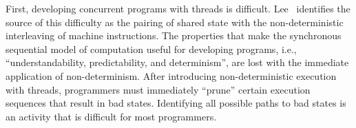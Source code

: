 First, developing concurrent programs with threads is difficult.
Lee~\cite{lee_threads} identifies the source of this difficulty as the pairing of shared state with the non-deterministic interleaving of machine instructions.
The properties that make the synchronous sequential model of computation useful for developing programs, i.e., ``understandability, predictability, and determinism'', are lost with the immediate application of non-determinism.
After introducing non-deterministic execution with threads, programmers must immediately ``prune'' certain execution sequences that result in bad states.
Identifying all possible paths to bad states is an activity that is difficult for most programmers.

